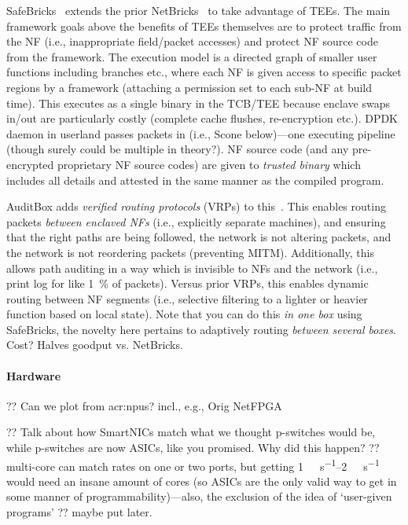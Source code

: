 SafeBricks~\parencite{DBLP:conf/nsdi/PoddarLPR18} extends the prior NetBricks~\parencite{DBLP:conf/osdi/PandaHJWRS16} to take advantage of TEEs.
The main framework goals above the benefits of TEEs themselves are to protect traffic from the NF (i.e., inappropriate field/packet accesses) and protect NF source code from the framework.
The execution model is a directed graph of smaller user functions including branches etc., where each NF is given access to specific packet regions by a framework (attaching a permission set to each sub-NF at build time).
This executes as a single binary in the TCB/TEE because enclave swaps in/out are particularly costly (complete cache flushes, re-encryption etc.).
DPDK daemon in userland passes packets in (i.e., Scone below)---one executing pipeline (though surely could be multiple in theory?).
NF source code (and any pre-encrypted proprietary NF source codes) are given to \emph{trusted binary} which includes all details and attested in the same manner as the compiled program.

AuditBox adds \emph{verified routing protocols} (VRPs) to this~\parencite{DBLP:conf/nsdi/LiuSKPSS21}.
This enables routing packets \emph{between enclaved NFs} (i.e., explicitly separate machines), and ensuring that the right paths are being followed, the network is not altering packets, and the network is not reordering packets (preventing MITM).
Additionally, this allows path auditing in a way which is invisible to NFs and the network (i.e., print log for like \qty{1}{\percent} of packets).
Versus prior VRPs, this enables dynamic routing between NF segments (i.e., selective filtering to a lighter or heavier function based on local state).
Note that you can do this \emph{in one box} using SafeBricks, the novelty here pertains to adaptively routing \emph{between several boxes}.
Cost? Halves goodput vs. NetBricks.

\paragraph{Hardware}
?? Can we plot from \glspl{acr:npu}? incl., e.g., Orig NetFPGA~\parencite{DBLP:conf/mse/LockwoodMWGHNRL07}

?? Talk about how SmartNICs match what we thought p-switches would be, while p-switches are now ASICs, like you promised. Why did this happen? ?? multi-core can match rates on one or two ports, but getting \qtyrange{1}{2}{\tera\bit\per\second} would need an insane amount of cores (so ASICs are the only valid way to get in some manner of programmability)---also, the exclusion of the idea of `user-given programs' ?? maybe put later.

